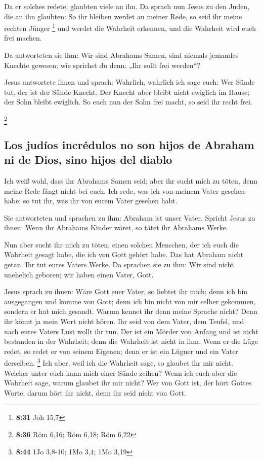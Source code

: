  Da er solches redete, glaubten viele an ihn.
 Da sprach nun Jesus zu den Juden, die an ihn glaubten:
So ihr bleiben werdet an meiner Rede, so seid ihr meine rechten Jünger
\footnote{\textbf{8:31} Joh 15,7}  und werdet die
Wahrheit erkennen, und die Wahrheit wird euch frei machen.

 Da antworteten sie ihm: Wir sind Abrahams Samen, sind
niemals jemandes Knechte gewesen; wie sprichst du denn: „Ihr sollt frei
werden``?

 Jesus antwortete ihnen und sprach: Wahrlich, wahrlich
ich sage euch: Wer Sünde tut, der ist der Sünde Knecht. 
Der Knecht aber bleibt nicht ewiglich im Hause; der Sohn bleibt
ewiglich.  So euch nun der Sohn frei macht, so seid ihr
recht frei.

\footnote{\textbf{8:36} Röm 6,16; Röm 6,18; Röm 6,22}

\hypertarget{los-juduxedos-incruxe9dulos-no-son-hijos-de-abraham-ni-de-dios-sino-hijos-del-diablo}{%
\subsection{Los judíos incrédulos no son hijos de Abraham ni de Dios,
sino hijos del
diablo}\label{los-juduxedos-incruxe9dulos-no-son-hijos-de-abraham-ni-de-dios-sino-hijos-del-diablo}}

 Ich weiß wohl, dass ihr Abrahams Samen seid; aber ihr
sucht mich zu töten, denn meine Rede fängt nicht bei euch.
 Ich rede, was ich von meinem Vater gesehen habe; so tut
ihr, was ihr von eurem Vater gesehen habt.

 Sie antworteten und sprachen zu ihm: Abraham ist unser
Vater. Spricht Jesus zu ihnen: Wenn ihr Abrahams Kinder wäret, so tätet
ihr Abrahams Werke.

 Nun aber sucht ihr mich zu töten, einen solchen
Menschen, der ich euch die Wahrheit gesagt habe, die ich von Gott gehört
habe. Das hat Abraham nicht getan.  Ihr tut eures Vaters
Werke. Da sprachen sie zu ihm: Wir sind nicht unehelich geboren; wir
haben einen Vater, Gott.

 Jesus sprach zu ihnen: Wäre Gott euer Vater, so liebtet
ihr mich; denn ich bin ausgegangen und komme von Gott; denn ich bin
nicht von mir selber gekommen, sondern er hat mich gesandt.
 Warum kennet ihr denn meine Sprache nicht? Denn ihr
könnt ja mein Wort nicht hören.  Ihr seid von dem Vater,
dem Teufel, und nach eures Vaters Lust wollt ihr tun. Der ist ein Mörder
von Anfang und ist nicht bestanden in der Wahrheit; denn die Wahrheit
ist nicht in ihm. Wenn er die Lüge redet, so redet er von seinem
Eigenen; denn er ist ein Lügner und ein Vater derselben. \footnote{\textbf{8:44}
  1Jo 3,8-10; 1Mo 3,4; 1Mo 3,19}  Ich aber, weil ich die
Wahrheit sage, so glaubet ihr mir nicht.  Welcher unter
euch kann mich einer Sünde zeihen? Wenn ich euch aber die Wahrheit sage,
warum glaubet ihr mir nicht?  Wer von Gott ist, der hört
Gottes Worte; darum hört ihr nicht, denn ihr seid nicht von Gott.

